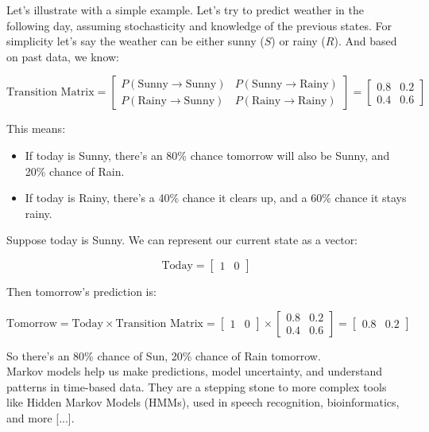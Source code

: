 \documentclass{book}
\begin{document}
Let's illustrate with a simple example. Let's try to predict weather in the following day, assuming stochasticity and knowledge of the previous states. For simplicity let’s say the weather can be either sunny ($S$) or rainy ($R$). And based on past data, we know:

\[
\text{Transition Matrix} =
\begin{bmatrix}
P(\text{Sunny} \rightarrow \text{Sunny}) & P(\text{Sunny} \rightarrow \text{Rainy}) \\
P(\text{Rainy} \rightarrow \text{Sunny}) & P(\text{Rainy} \rightarrow \text{Rainy})
\end{bmatrix}
=
\begin{bmatrix}
0.8 & 0.2 \\
0.4 & 0.6
\end{bmatrix}
\]

This means:
\begin{itemize}
  \item If today is Sunny, there's an 80\% chance tomorrow will also be Sunny, and 20\% chance of Rain.
  \item If today is Rainy, there's a 40\% chance it clears up, and a 60\% chance it stays rainy.
\end{itemize}

Suppose today is Sunny. We can represent our current state as a vector:

\[
\text{Today} = \begin{bmatrix} 1 & 0 \end{bmatrix}
\]

Then tomorrow’s prediction is:

\[
\text{Tomorrow} = \text{Today} \times \text{Transition Matrix} = 
\begin{bmatrix} 1 & 0 \end{bmatrix} \times
\begin{bmatrix}
0.8 & 0.2 \\
0.4 & 0.6
\end{bmatrix}
=
\begin{bmatrix}
0.8 & 0.2
\end{bmatrix}
\]

So there's an 80\% chance of Sun, 20\% chance of Rain tomorrow.\\

Markov models help us make predictions, model uncertainty, and understand patterns in time-based data. They are a stepping stone to more complex tools like Hidden Markov Models (HMMs), used in speech recognition, bioinformatics, and more [...].\\
\end{document}
